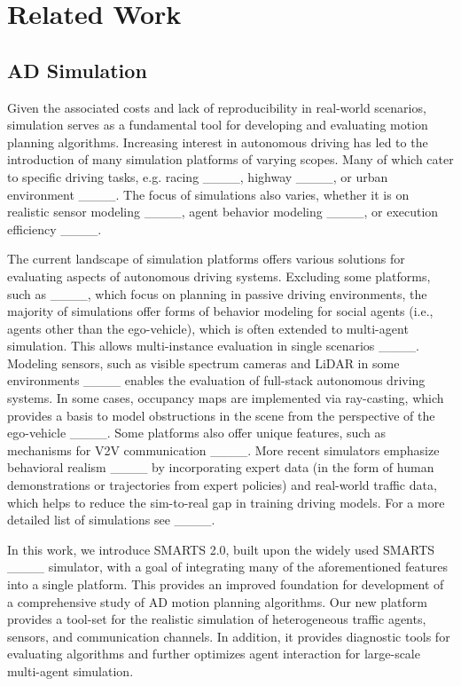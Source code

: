 \section{Related Work}
\subsection{AD Simulation}
Given the associated costs and lack of reproducibility in real-world scenarios, simulation serves as a fundamental tool for developing and evaluating motion planning algorithms. Increasing interest in autonomous driving has led to the introduction of many simulation platforms of varying scopes. Many of which cater to specific driving tasks, e.g. racing ____, highway ____, or urban environment ____. The focus of simulations also varies, whether it is on realistic sensor modeling ____, agent behavior modeling ____, or execution efficiency ____.

The current landscape of simulation platforms offers various solutions for evaluating aspects of autonomous driving systems. Excluding some platforms, such as ____, which focus on planning in passive driving environments, the majority of simulations offer forms of behavior modeling for social agents (i.e., agents other than the ego-vehicle), which is often extended to multi-agent simulation. This allows multi-instance evaluation in single scenarios ____. Modeling sensors, such as visible spectrum cameras and LiDAR in some environments ____ enables the evaluation of full-stack autonomous driving systems. In some cases, occupancy maps are implemented via ray-casting, which provides a basis to model obstructions in the scene from the perspective of the ego-vehicle ____. Some platforms also offer unique features, such as mechanisms for V2V communication ____. More recent simulators emphasize behavioral realism ____ by incorporating expert data (in the form of human demonstrations or trajectories from expert policies) and real-world traffic data, which helps to reduce the sim-to-real gap in training driving models. For a more detailed list of simulations see ____.

In this work, we introduce SMARTS 2.0, built upon the widely used SMARTS ____ simulator, with a goal of integrating many of the aforementioned features into a single platform. This provides an improved foundation for development of a comprehensive study of AD motion planning algorithms. Our new platform provides a tool-set for the realistic simulation of heterogeneous traffic agents, sensors, and communication channels. In addition, it provides diagnostic tools for evaluating algorithms and further optimizes agent interaction for large-scale multi-agent simulation.

